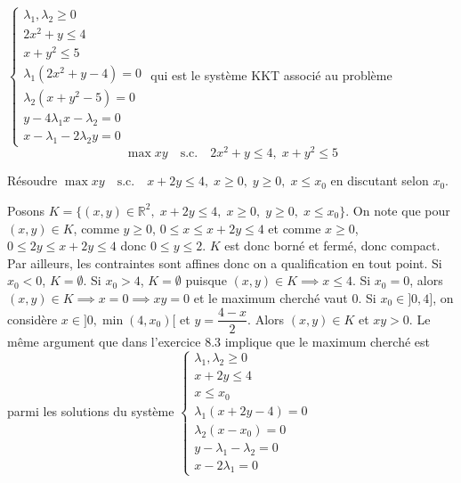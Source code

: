 \documentclass{fancybook}
\begin{document}
$\begin{cases}
\lambda_1,\lambda_2\geq 0 \\
2x^2+y\leq 4 \\
x+y^2\leq 5 \\
\lambda_1 (2x^2+y -4)=0 \\
\lambda_2 (x+y^2- 5)=0 \\
y-4\lambda_1 x - \lambda_2  = 0 \\
x - \lambda_1 - 2 \lambda_2 y = 0
\end{cases}$\newline \newline
qui est le système KKT associé au problème $$\max xy \quad \text{s.c.} \quad 2x^2+y\leq 4, \; x+y^2\leq 5$$

\begin{exercice}
Résoudre $\max xy \quad \text{s.c.} \quad x+2y\leq 4,\; x\geq 0,\; y\geq 0,\; x\leq x_0 $ en discutant selon $x_0$.
\end{exercice}
Posons $K=\{(x,y)\in \mathbb R^2,\; x+2y\leq 4,\; x\geq 0,\; y\geq 0,\; x\leq x_0\}$.\newline
On note que pour $(x,y)\in K$, comme $y\geq 0$, $0\leq x\leq x+2y \leq 4$ et comme $x\geq 0$, $0\leq 2y \leq x+2y \leq 4$ donc $0\leq y \leq 2$. $K$ est donc borné et fermé, donc compact. \newline
Par ailleurs, les contraintes sont affines donc on a qualification en tout point.\newline
\newline 
Si $x_0<0$, $K=\emptyset$.\newline
Si $x_0>4$, $K=\emptyset$ puisque $(x,y)\in K \implies x\leq 4$. \newline
Si $x_0=0$, alors $(x,y)\in K \implies x=0 \implies xy=0$ et le maximum cherché vaut $0$.\newline
Si $x_0\in ]0,4]$, on considère $x\in ]0,\min(4,x_0)[$ et $y=\dfrac{4-x}{2}$. Alors $(x,y)\in K$ et $xy>0$. Le même argument que dans l'exercice 8.3 implique que le maximum cherché est parmi les solutions du système \newline
$\begin{cases}
\lambda_1, \lambda_2\geq 0 \\
x+2y\leq 4 \\
x\leq x_0 \\
\lambda_1(x+2y-4)=0 \\
\lambda_2 (x-x_0)=0 \\
y-\lambda_1-\lambda_2=0 \\
x-2\lambda_1=0
\end{cases}$ \newline
\end{document}
